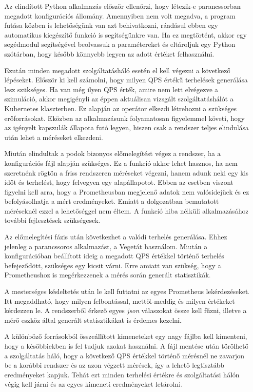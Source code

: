 Az elindított Python alkalmazás először ellenőrzi, hogy létezik-e parancssorban megadott konfigurációs állomány.
Amennyiben nem volt megadva, a program futása közben is lehetőségünk van azt behivatkozni, ráadásul ebben egy automatikus kiegészítő funkció is segítségünkre van.
Ha ez megtörtént, akkor egy segédmodul segítségével beolvassuk a paramétereket és eltároljuk egy Python szótárban, hogy később könnyebb legyen az adott értéket felhasználni.

Ezután minden megadott szolgáltatásháló esetén el kell végezni a következő lépéseket.
Először ki kell számolni, hogy milyen QPS értékű terhelések generálása lesz szükséges.
Ha van még ilyen QPS érték, amire nem lett elvégezve a szimuláció, akkor megigényli az éppen aktuálisan vizsgált szolgáltatáshálót a Kubernetes klaszterben.
Ez alapján az operátor elkezdi létrehozni a szükséges erőforrásokat. 
Eközben az alkalmazásunk folyamatosan figyelemmel követi, hogy az igényelt kapszulák állapota futó legyen, hiszen csak a rendszer teljes elindulása után lehet a méréseket elkezdeni.

Miután elindultak a podok bizonyos előmelegítést végez a rendszer, ha a konfigurációs fájl alapján szükséges.
Ez a funkció akkor lehet hasznos, ha nem szeretnénk rögtön a friss rendszeren méréseket végezni, hanem adunk neki egy kis időt és terhelést, hogy felvegyen egy alapállapotot.
Ebben az esetben viszont figyelni kell arra, hogy a Prometheusban megjelenő adatok nem valósidejűek és ez befolyásolhatja a mért eredményeket.
Emiatt a dolgozatban bemutatott méréseknél ezzel a lehetőséggel nem éltem.
A funkció hiba nélküli alkalmazásához további fejlesztések szükségesek.

Az előmelegítési fázis után következhet a valódi terhelés generálása.
Ehhez jelenleg a parancssoros alkalmazást, a Vegetát használom.
Miután a konfigurációban beállított ideig a megadott QPS értékkel történő terhelés befejeződött, szükséges egy kicsit várni.
Erre amiatt van szükség, hogy a Prometheushoz is megérkezzenek a mérés során generált statisztikák.

A mesterséges késleltetés után le kell futtatni az egyes Prometheus lekérdezéseket.
Itt megaddható, hogy milyen felbontással, mettől-meddig és milyen értékeket kérdezzen le.
A rendszerből érkező egyes \textit{json} válaszokat össze kell fűzni, illetve a mérő eszköz által generált statisztikákat is érdemes kezelni.

A különböző forrásokból összeállított kimeneteket egy nagy fájlba kell kimenteni, hogy a későbbiekben is fel tudjuk azokat használni.
A fájl mentése után törölhető a szolgáltatás háló, hogy a következő QPS értékkel történő mérésnél ne zavarjon be a korábbi rendszer és az azon végzett  mérések, így a lehető legtisztább eredményeket kapjuk.
Tehát ezt minden terhelési értékre és szolgáltatási hálón végig kell járni és az egyes kimeneti eredményeket letárolni.

